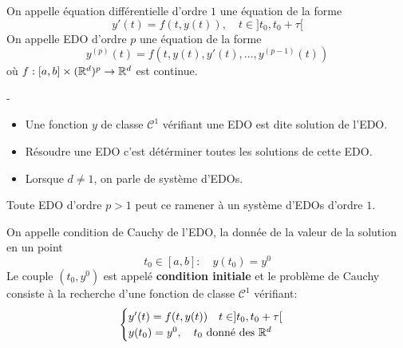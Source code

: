 \begin{definition}
    On appelle équation différentielle d'ordre $1$ une équation de la forme 
     \[
         y'(t) = f(t, y(t)), \quad t \in ]t_0, t_0 + \tau[
    \] 
    On appelle EDO d'ordre $p$ une équation de la forme 
     \[
         y^{(p)}(t) = f(t, y(t), y'(t), \ldots, y^{(p-1)}(t))
    \] 
    où $f: [a, b] \times (\mathbb{R}^d)^p \to \mathbb{R}^d$ est continue.
\end{definition}
\begin{definition}-
    \begin{itemize}
        \item 
            Une fonction $y$ de classe  $\mathcal{C}^1$ vérifiant une EDO est dite solution de l'EDO.

        \item 
            Résoudre une EDO c'est détérminer toutes les solutions de cette EDO.     

        \item 
            Lorsque $d \neq 1$, on parle de système d'EDOs.
    \end{itemize}
\end{definition}
\begin{remark}
   Toute EDO d'ordre $p > 1$ peut ce ramener à un système d'EDOs d'ordre  $1$. 
\end{remark}
\begin{definition}
    On appelle condition de Cauchy de l'EDO, la donnée de la valeur de la solution en un point 
    \[
        t_0 \in [a, b]: \quad y(t_0) = y^0
    \] 
    Le couple $(t_0, y^0)$ est appelé \textbf{condition initiale} et le problème de Cauchy consiste à la recherche d'une fonction de classe $\mathcal{C}^1$ vérifiant:
     \[
    \begin{cases}
        y'(t) = f(t, y(t)) \quad t \in ]t_0, t_0 + \tau[\\
        y(t_0) = y^0, \quad t_0 \text{ donné des } \mathbb{R}^d  
    \end{cases}
    \] 
\end{definition}
